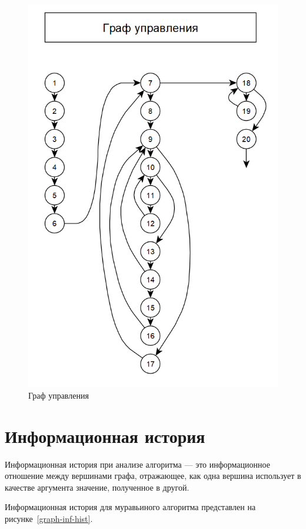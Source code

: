 \documentclass[a4paper, 12pt]{extreport}
\begin{document}
\begin{figure}[h]
	\centering
	\includegraphics[scale=0.9]{tools/graph-control.png}
	\caption{Граф управления}
	\label{graph-control}
\end{figure}

\chapter{Информационная история}

Информационная история при анализе алгоритма --- это информационное отношение между вершинами графа, отражающее, 
как одна вершина использует в качестве аргумента значение, полученное в другой.

Информационная история для муравьиного алгоритма представлен на рисунке~\ref{graph-inf-hist}.
\end{document}
